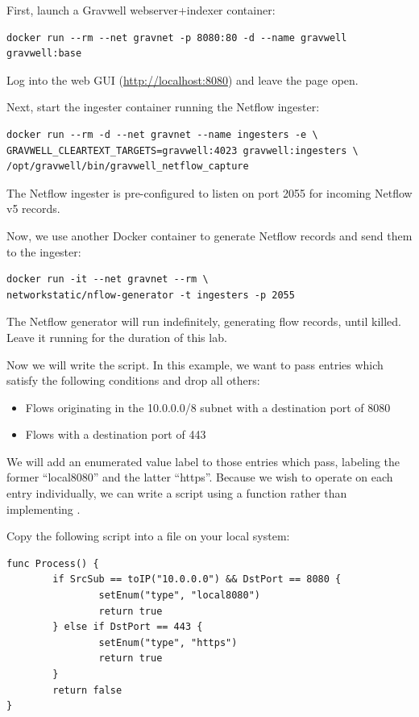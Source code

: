 First, launch a Gravwell webserver+indexer container:

\begin{Verbatim}[breaklines=true]
docker run --rm --net gravnet -p 8080:80 -d --name gravwell gravwell:base
\end{Verbatim}

Log into the web GUI (\href{http://localhost:8080}{http://localhost:8080}) and leave the page open.

Next, start the ingester container running the Netflow ingester:

\begin{Verbatim}[breaklines=true]
docker run --rm -d --net gravnet --name ingesters -e \
GRAVWELL_CLEARTEXT_TARGETS=gravwell:4023 gravwell:ingesters \
/opt/gravwell/bin/gravwell_netflow_capture
\end{Verbatim}

The Netflow ingester is pre-configured to listen on port 2055 for
incoming Netflow v5 records.

Now, we use another Docker container to generate Netflow records and
send them to the ingester:

\begin{Verbatim}[breaklines=true]
docker run -it --net gravnet --rm \
networkstatic/nflow-generator -t ingesters -p 2055
\end{Verbatim}

The Netflow generator will run indefinitely, generating flow records,
until killed. Leave it running for the duration of this lab.

Now we will write the script. In this example, we want to pass entries
which satisfy the following conditions and drop all others:

\begin{itemize}
\item
  Flows originating in the 10.0.0.0/8 subnet with a destination port of
  8080
\item
  Flows with a destination port of 443
\end{itemize}

We will add an enumerated value label to those entries which pass,
labeling the former ``local8080'' and the latter ``https''. Because we
wish to operate on each entry individually, we can write a script using
a \code{Process} function rather than implementing \code{Main}.

Copy the following script into a file on your local system:

\begin{Verbatim}[breaklines=true]
func Process() {
        if SrcSub == toIP("10.0.0.0") && DstPort == 8080 {
                setEnum("type", "local8080")
                return true
        } else if DstPort == 443 {
                setEnum("type", "https")
                return true
        }
        return false
}
\end{Verbatim}

